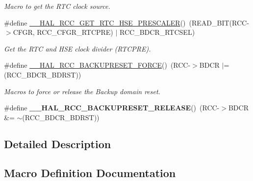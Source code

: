 \begin{DoxyCompactItemize}
\begin{DoxyCompactList}\small\item\em Macro to get the R\+TC clock source. \end{DoxyCompactList}\item 
\#define \mbox{\hyperlink{group___r_c_c___internal___r_t_c___clock___configuration_ga85dc62f0fcb14981c47d7f7da25e26d6}{\+\_\+\+\_\+\+H\+A\+L\+\_\+\+R\+C\+C\+\_\+\+G\+E\+T\+\_\+\+R\+T\+C\+\_\+\+H\+S\+E\+\_\+\+P\+R\+E\+S\+C\+A\+L\+ER}}()~(R\+E\+A\+D\+\_\+\+B\+IT(R\+CC-\/$>$C\+F\+GR, R\+C\+C\+\_\+\+C\+F\+G\+R\+\_\+\+R\+T\+C\+P\+RE) $\vert$ R\+C\+C\+\_\+\+B\+D\+C\+R\+\_\+\+R\+T\+C\+S\+EL)
\begin{DoxyCompactList}\small\item\em Get the R\+TC and H\+SE clock divider (R\+T\+C\+P\+RE). \end{DoxyCompactList}\item 
\#define \mbox{\hyperlink{group___r_c_c___internal___r_t_c___clock___configuration_ga3bf7da608ff985873ca8e248fb1dc4f0}{\+\_\+\+\_\+\+H\+A\+L\+\_\+\+R\+C\+C\+\_\+\+B\+A\+C\+K\+U\+P\+R\+E\+S\+E\+T\+\_\+\+F\+O\+R\+CE}}()~(R\+CC-\/$>$B\+D\+CR $\vert$= (R\+C\+C\+\_\+\+B\+D\+C\+R\+\_\+\+B\+D\+R\+ST))
\begin{DoxyCompactList}\small\item\em Macros to force or release the Backup domain reset. \end{DoxyCompactList}\item 
\mbox{\label{group___r_c_c___internal___r_t_c___clock___configuration_ga14f32622c65f4ae239ba8cb00d510321}} 
\#define {\bfseries \+\_\+\+\_\+\+H\+A\+L\+\_\+\+R\+C\+C\+\_\+\+B\+A\+C\+K\+U\+P\+R\+E\+S\+E\+T\+\_\+\+R\+E\+L\+E\+A\+SE}()~(R\+CC-\/$>$B\+D\+CR \&= $\sim$(R\+C\+C\+\_\+\+B\+D\+C\+R\+\_\+\+B\+D\+R\+ST))
\end{DoxyCompactItemize}


\subsection{Detailed Description}


\subsection{Macro Definition Documentation}
\mbox{\label{group___r_c_c___internal___r_t_c___clock___configuration_ga3bf7da608ff985873ca8e248fb1dc4f0}} 
